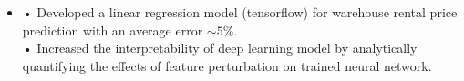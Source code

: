 \documentclass[11pt,a4paper,sans]{moderncv}       %
\begin{document}
\begin{itemize}
\vspace{8pt}


\item{
{\vspace{4pt}
• Developed a linear regression model (tensorflow) for warehouse rental price prediction with an average error $\sim 5\%$. 
\vspace{4pt}\\
• Increased the interpretability of deep learning model by analytically quantifying the effects of feature perturbation on  trained neural network. }
}

\vspace{1pt}

\end{itemize}

%
%
\end{document}
